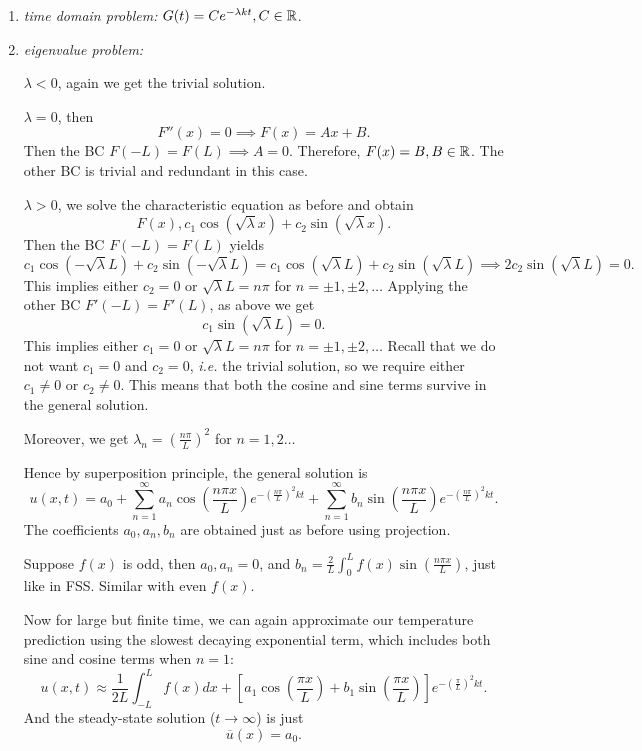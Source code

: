 \documentclass[class=article,crop=false]{standalone}
\begin{document}
\begin{enumerate}[label=\arabic*)]
	\item \emph{time domain problem: } $ G(t) = C e^{-\lambda kt}, C \in \mathbb{R}$.
	\item \emph{eigenvalue problem: }
~\begin{case}[]
$ \lambda < 0$, again we get the trivial solution.
\end{case}
\begin{case}[]
$ \lambda =0$, then
\[
	F''(x) = 0 \implies F(x) = Ax + B 
.\] 
Then the BC $ F(-L) = F(L) \implies A=0$. Therefore, $ F(x) = B, B \in \mathbb{R}$. The other BC is trivial and redundant in this case.
\end{case}
\begin{case}[]
$ \lambda>0$, we solve the characteristic equation as before and obtain
\[
	F(x), c_1 \cos(\sqrt{\lambda} x) + c_2 \sin(\sqrt{\lambda} x )
.\] 
Then the BC $ F(-L) = F(L)$ yields
 \[
c_1 \cos(-\sqrt{\lambda} L ) + c_2 \sin( -\sqrt{\lambda}L  ) = c_1\cos(\sqrt{\lambda}L  ) + c_2 \sin(\sqrt{\lambda} L ) \implies 2c_2 \sin(\sqrt{\lambda}L  )=0
.\] 
This implies either $ c_2 =0 $ or $ \sqrt{\lambda}L = n \pi $ for $ n = \pm 1, \pm 2,\ldots$ Applying the other BC $ F'(-L)=F'(L)$, as above we get
 \[
c_1 \sin(\sqrt{\lambda} L )=0
.\] 
This implies either $ c_1 =0$ or $ \sqrt{\lambda} L = n\pi $ for $ n=\pm 1, \pm 2,\ldots$ Recall that we do not want $ c_1=0$ and $ c_2 =0$, \emph{i.e.} the trivial solution, so we require either $ c_1 \neq 0$ or $ c_2 \neq 0$. This means that both the cosine and sine terms survive in the general solution.

Moreover, we get $ \lambda_n= \left( \frac{n\pi}{L } \right)^2 $ for $ n=1,2\ldots$ 

\end{case}
Hence by superposition principle, the general solution is
\[
	u(x,t) = a_0 + \sum_{ n= 1}^{\infty} a_n \cos \left( \frac{ n\pi x}{ L} \right) e^{-( \frac{ n\pi}{L} )^2 kt} + \sum_{ n= 1}^{\infty} b_n \sin \left( \frac{ n\pi x}{ L} \right) e^{-( \frac{ n\pi}{L} )^2 kt} 
.\] 
The coefficients $ a_0, a_n, b_n$ are obtained just as before using projection.
\begin{note}
Suppose $ f(x)$ is odd, then  $ a_0, a_n = 0$, and $ b_n = \frac{2}{L} \int_{0}^{L} f(x) \sin \left( \frac{ n\pi x}{ L} \right)  $, just like in FSS. Similar with even $ f(x)$. 
\end{note}

Now for large but finite time, we can again approximate our temperature prediction using the slowest decaying exponential term, which includes both sine and cosine terms when $ n=1$:
 \[
	 u(x,t) \approx \frac{1}{2L} \int_{-L}^{L} f(x) dx + \left[ a_1 \cos \left( \frac{ \pi x}{ L} \right) + b_1 \sin \left( \frac{ \pi x}{ L} \right)  \right] e^{-( \frac{ \pi}{L} )^2 kt} 
.\] 
And the steady-state solution ($ t \to \infty$) is just
\[
	\overline{u}(x) = a_0
.\] 
\end{enumerate}
\end{document}
